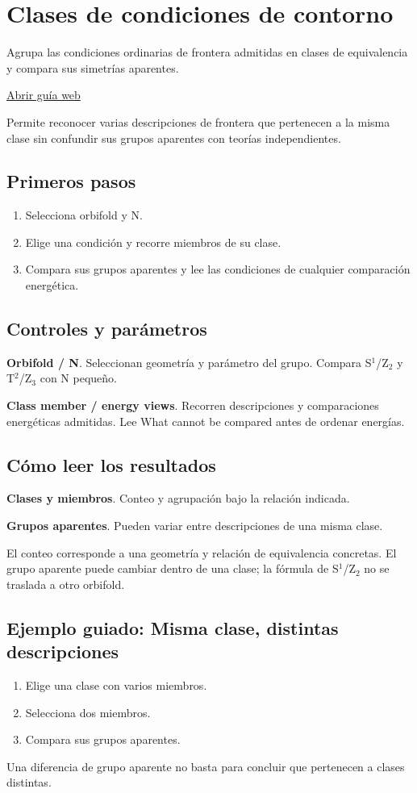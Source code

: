 \documentclass[11pt,a4paper]{article}
\begin{document}
\section{Clases de condiciones de contorno}
Agrupa las condiciones ordinarias de frontera admitidas en clases de equivalencia y compara sus simetrías aparentes.

\href{https://karlesmarin.github.io/ghu-explorer/guide/es/bcclass/index.html}{Abrir guía web}

Permite reconocer varias descripciones de frontera que pertenecen a la misma clase sin confundir sus grupos aparentes con teorías independientes.
\subsection*{Primeros pasos}
\begin{enumerate}
\item Selecciona orbifold y N.
\item Elige una condición y recorre miembros de su clase.
\item Compara sus grupos aparentes y lee las condiciones de cualquier comparación energética.
\end{enumerate}
\subsection*{Controles y parámetros}
\textbf{Orbifold / N}. Seleccionan geometría y parámetro del grupo. Compara S\ensuremath{{}^{1}}/Z\ensuremath{{}_{2}} y T\ensuremath{{}^{2}}/Z\ensuremath{{}_{3}} con N pequeño.

\textbf{Class member / energy views}. Recorren descripciones y comparaciones energéticas admitidas. Lee What cannot be compared antes de ordenar energías.

\subsection*{Cómo leer los resultados}
\textbf{Clases y miembros}. Conteo y agrupación bajo la relación indicada.

\textbf{Grupos aparentes}. Pueden variar entre descripciones de una misma clase.

El conteo corresponde a una geometría y relación de equivalencia concretas. El grupo aparente puede cambiar dentro de una clase; la fórmula de S\ensuremath{{}^{1}}/Z\ensuremath{{}_{2}} no se traslada a otro orbifold.
\subsection*{Ejemplo guiado: Misma clase, distintas descripciones}
\begin{enumerate}
\item Elige una clase con varios miembros.
\item Selecciona dos miembros.
\item Compara sus grupos aparentes.
\end{enumerate}
Una diferencia de grupo aparente no basta para concluir que pertenecen a clases distintas.
\end{document}
